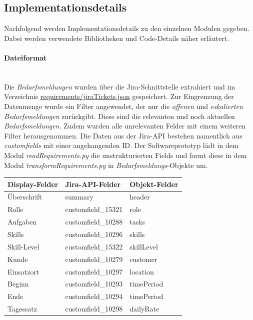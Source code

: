 \subsection{Implementationsdetails}
Nachfolgend werden Implementationsdetails zu den einzelnen Modulen gegeben. Dabei werden verwendete Bibliotheken und Code-Details näher erläutert.
\paragraph{Dateiformat}\mbox{}\\
Die \emph{Bedarfsmeldungen} wurden über die Jira-Schnittstelle extrahiert und im Verzeichnis \url{requirements/jiraTickets.json} gespeichert. Zur Eingrenzung der Datenmenge wurde ein Filter angewendet, der nur die \emph{offenen} und \emph{eskalierten} \emph{Bedarfsmeldungen} zurückgibt. Diese sind die relevanten und noch aktuellen \emph{Bedarfsmeldungen}. Zudem wurden alle unrelevanten Felder mit einem weiteren Filter herausgenommen. Die Daten aus der Jira-API bestehen namentlich aus \emph{customfields} mit einer angehangenden ID. Der Softwareprototyp lädt in dem Modul \emph{readRequirements.py} die unstrukturierten Fields und formt diese in dem Modul \emph{transformRequirements.py} in \emph{Bedarfsmeldungs}-Objekte um.
\begin{center}
	\begin{tabularx}{1\textwidth} { 
			| >{\raggedright\arraybackslash}X 
			| >{\raggedright\arraybackslash}X
			| >{\raggedright\arraybackslash}X | }
		\hline
		Display-Felder & Jira-API-Felder & Objekt-Felder \\
		\hline
		\hline
		Überschrift & summary & header\\
		\hline
		Rolle & customfield\_15321 & role\\
		\hline
		Aufgaben & customfield\_10288 & tasks\\
		\hline
		Skills & customfield\_10296 & skills\\
		\hline
		Skill-Level & customfield\_15322 & skillLevel\\
		\hline
		Kunde & customfield\_10279 & customer\\
		\hline
		Einsatzort & customfield\_10297 & location\\
		\hline
		Beginn & customfield\_10293 & timePeriod\\
		\hline
		Ende & customfield\_10294 & timePeriod\\
		\hline
		Tagessatz & customfield\_10298 & dailyRate\\
		\hline
	\end{tabularx}\\
	\label{tab:jiradaten}
\end{center}
